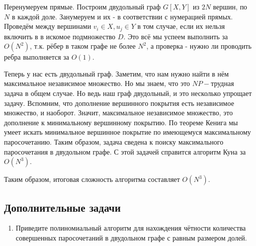 \begin{enumerate}
	Перенумеруем прямые. Построим двудольный граф $G[X,Y]$ из $2N$ вершин, по $N$ в каждой доле. Занумеруем и 
	их - в соответствии с нумерацией прямых. Проведём между вершинами $v_{i} \in X, u_j \in Y$ в том случае, 
	если их нельзя включить в в искомое подмножество $D$. Это всё мы успеем выполнить за $O(N ^ 2)$, т.к. рёбер 
	в таком графе не более $N^2$, а проверка - нужно ли проводить ребра выполняется за $O(1)$. 
	
	Теперь у нас есть двудольный граф. Заметим, что нам нужно найти в нём максимальное независимое множество. 
	Но мы знаем, что это $NP-$трудная задача в общем случае. Но ведь наш граф двудольный, и это несколько 
	упрощает задачу. Вспомним, что дополнение вершинного покрытия есть независимое множество, и наоборот. 
	Значит, максимальное независимое множество, это дополнение к минимальному вершинному покрытию. По теореме 
	Кенига мы умеет искать минимальное вершинное покрытие по имеющемуся максимальному паросочетанию. Таким 
	образом, задача сведена к поиску максимального паросочетания в двудольном графе. С этой задачей справится 
	алгоритм Куна за $O(N^3)$.
	
	Таким образом, итоговая сложность алгоритма составляет $O(N^3)$.
	 
\end{enumerate}

\subsection*{Дополнительные задачи}
\begin{enumerate}
	\item Приведите полиномиальный алгоритм для нахождения чётности количества совершенных паросочетаний в 
	двудольном графе с равным размером долей.
\end{enumerate}